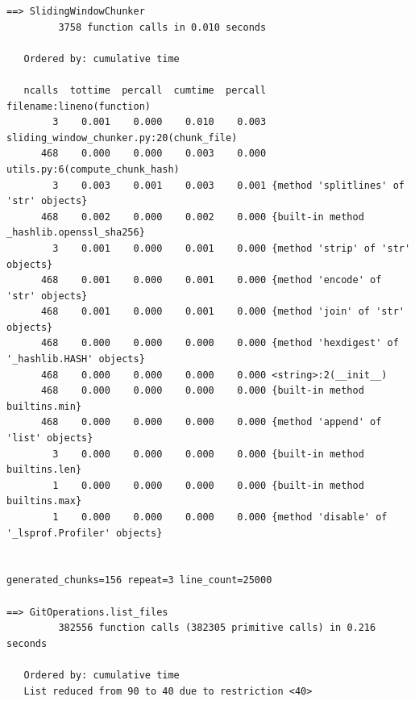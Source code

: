 \documentclass[a4paper,12pt]{article}
\begin{document}
\begin{lstlisting}[basicstyle=\ttfamily\fontsize{9}{9}\selectfont]
==> SlidingWindowChunker
         3758 function calls in 0.010 seconds

   Ordered by: cumulative time

   ncalls  tottime  percall  cumtime  percall filename:lineno(function)
        3    0.001    0.000    0.010    0.003 sliding_window_chunker.py:20(chunk_file)
      468    0.000    0.000    0.003    0.000 utils.py:6(compute_chunk_hash)
        3    0.003    0.001    0.003    0.001 {method 'splitlines' of 'str' objects}
      468    0.002    0.000    0.002    0.000 {built-in method _hashlib.openssl_sha256}
        3    0.001    0.000    0.001    0.000 {method 'strip' of 'str' objects}
      468    0.001    0.000    0.001    0.000 {method 'encode' of 'str' objects}
      468    0.001    0.000    0.001    0.000 {method 'join' of 'str' objects}
      468    0.000    0.000    0.000    0.000 {method 'hexdigest' of '_hashlib.HASH' objects}
      468    0.000    0.000    0.000    0.000 <string>:2(__init__)
      468    0.000    0.000    0.000    0.000 {built-in method builtins.min}
      468    0.000    0.000    0.000    0.000 {method 'append' of 'list' objects}
        3    0.000    0.000    0.000    0.000 {built-in method builtins.len}
        1    0.000    0.000    0.000    0.000 {built-in method builtins.max}
        1    0.000    0.000    0.000    0.000 {method 'disable' of '_lsprof.Profiler' objects}


generated_chunks=156 repeat=3 line_count=25000

==> GitOperations.list_files
         382556 function calls (382305 primitive calls) in 0.216 seconds

   Ordered by: cumulative time
   List reduced from 90 to 40 due to restriction <40>


\end{lstlisting}
\end{document}

